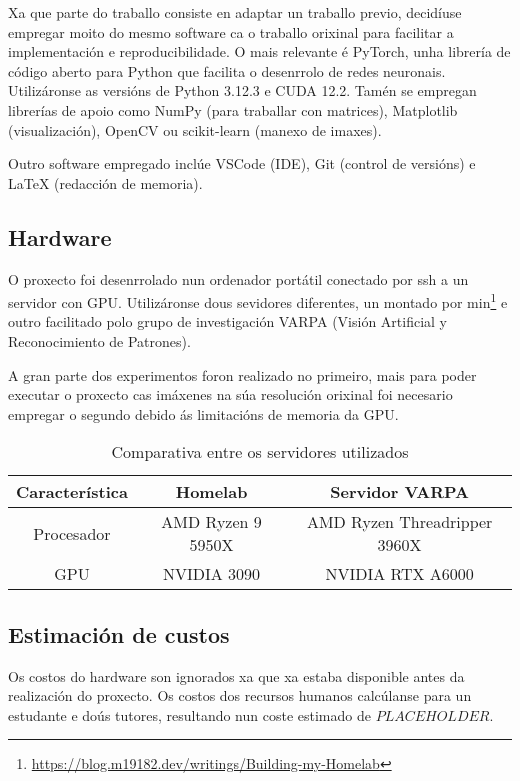 Xa que parte do traballo consiste en adaptar un traballo previo, 
decidíuse empregar moito do mesmo software ca o traballo orixinal para facilitar a implementación e reproducibilidade.
O mais relevante é PyTorch, unha librería de código aberto para Python que facilita o desenrrolo de redes neuronais. Utilizáronse as versións de Python 3.12.3 e CUDA 12.2. Tamén se empregan librerías de apoio como NumPy (para traballar con matrices), Matplotlib (visualización), OpenCV ou scikit-learn (manexo de imaxes).

Outro software empregado inclúe VSCode (IDE), Git (control de versións) e LaTeX (redacción de memoria).

\subsection{Hardware}
\label{subsec:Hardware}

O proxecto foi desenrrolado nun ordenador portátil conectado por ssh a un servidor con GPU. 
Utilizáronse dous sevidores diferentes, un montado por min\footnote{\url{https://blog.m19182.dev/writings/Building-my-Homelab}} e outro facilitado polo grupo de investigación VARPA (Visión Artificial y Reconocimiento de Patrones).

A gran parte dos experimentos foron realizado no primeiro, mais para poder executar o proxecto cas imáxenes na súa resolución orixinal foi necesario empregar o segundo 
debido ás limitacións de memoria da GPU. 

\begin{table}[h]
\centering
\begin{tabular}{|c|c|c|}
\hline
\textbf{Característica} & \textbf{Homelab} & \textbf{Servidor VARPA} \\ \hline
Procesador & AMD Ryzen 9 5950X&  AMD Ryzen Threadripper 3960X \\ \hline
GPU & NVIDIA 3090 & NVIDIA RTX A6000  \\ \hline
\end{tabular}
\caption{Comparativa entre os servidores utilizados}
\label{tab:comparativa_servidores}
\end{table}


\subsection{Estimación de custos}
\label{subsec:Estimación de custos}

Os costos do hardware son ignorados xa que xa estaba disponible antes da realización do proxecto.
Os costos dos recursos humanos calcúlanse para un estudante e doús tutores, resultando nun coste estimado de $PLACEHOLDER$.

